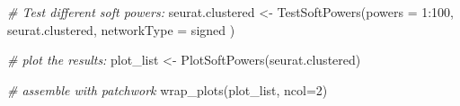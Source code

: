 \documentclass[
  letterpaper,
  DIV=11,
  numbers=noendperiod]{scrartcl}
\newenvironment{Shaded}{}{}
\newcommand{\AttributeTok}[1]{\textcolor[rgb]{0.49,0.56,0.16}{#1}}
\newcommand{\CommentTok}[1]{\textcolor[rgb]{0.38,0.63,0.69}{\textit{#1}}}
\newcommand{\DecValTok}[1]{\textcolor[rgb]{0.25,0.63,0.44}{#1}}
\newcommand{\FunctionTok}[1]{\textcolor[rgb]{0.02,0.16,0.49}{#1}}
\newcommand{\NormalTok}[1]{#1}
\newcommand{\OtherTok}[1]{\textcolor[rgb]{0.00,0.44,0.13}{#1}}
\newcommand{\SpecialCharTok}[1]{\textcolor[rgb]{0.25,0.44,0.63}{#1}}
\newcommand{\StringTok}[1]{\textcolor[rgb]{0.25,0.44,0.63}{#1}}
\begin{document}
\begin{Shaded}
\begin{Highlighting}[]
\CommentTok{\# Test different soft powers:}
\NormalTok{seurat.clustered }\OtherTok{\textless{}{-}} \FunctionTok{TestSoftPowers}\NormalTok{(}\AttributeTok{powers =} \DecValTok{1}\SpecialCharTok{:}\DecValTok{100}\NormalTok{,}
\NormalTok{  seurat.clustered,}
  \AttributeTok{networkType =} \StringTok{\textquotesingle{}signed\textquotesingle{}}
\NormalTok{)}

\CommentTok{\# plot the results:}
\NormalTok{plot\_list }\OtherTok{\textless{}{-}} \FunctionTok{PlotSoftPowers}\NormalTok{(seurat.clustered)}

\CommentTok{\# assemble with patchwork}
\FunctionTok{wrap\_plots}\NormalTok{(plot\_list, }\AttributeTok{ncol=}\DecValTok{2}\NormalTok{)}
\end{Highlighting}
\end{Shaded}
\end{document}
